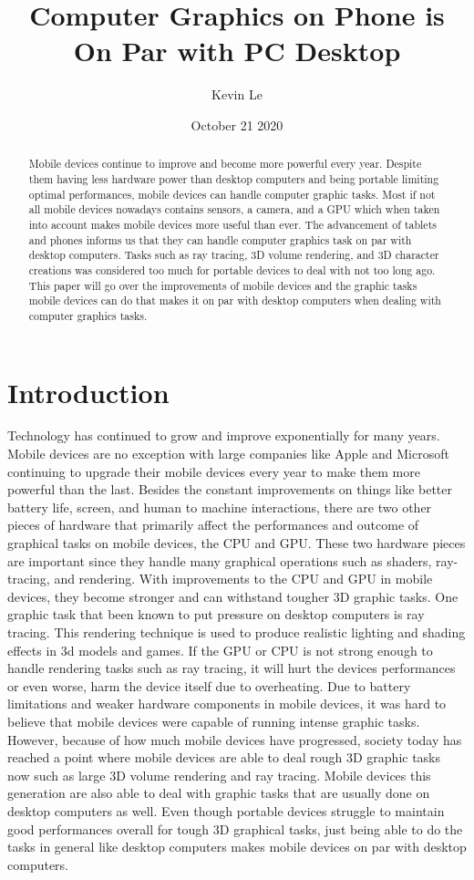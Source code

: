 \documentclass{article}
\title{Computer Graphics on Phone is On Par with PC Desktop}
\author{Kevin Le}
\date{October 21 2020}
\begin{document}
\maketitle

\begin{abstract}
   Mobile devices continue to improve and become more powerful every year. Despite them having less hardware power than desktop computers and being portable limiting optimal performances, mobile devices can handle computer graphic tasks. Most if not all mobile devices nowadays contains sensors, a camera, and a GPU which when taken into account makes mobile devices more useful than ever. The advancement of tablets and phones informs us that they can handle computer graphics task on par with desktop computers. Tasks such as ray tracing, 3D volume rendering, and 3D character creations was considered too much for portable devices to deal with not too long ago. This paper will go over the improvements of mobile devices and the graphic tasks mobile devices can do that makes it on par with desktop computers when dealing with computer graphics tasks. 
\end{abstract}

\section{Introduction}
   Technology has continued to grow and improve exponentially for many years. Mobile devices are no exception with large companies like Apple and Microsoft continuing to upgrade their mobile devices every year to make them more powerful than the last. Besides the constant improvements on things like better battery life, screen, and human to machine interactions, there are two other pieces of hardware that primarily affect the performances and outcome of graphical tasks on mobile devices, the CPU and GPU. These two hardware pieces are important since they handle many graphical operations such as shaders, ray-tracing, and rendering. With improvements to the CPU and GPU in mobile devices, they become stronger and can withstand tougher 3D graphic tasks. One graphic task that been known to put pressure on desktop computers is ray tracing. This rendering technique is used to produce realistic lighting and shading effects in 3d models and games. If the GPU or CPU is not strong enough to handle rendering tasks such as ray tracing, it will hurt the devices performances or even worse, harm the device itself due to overheating. Due to battery limitations and weaker hardware components in mobile devices, it was hard to believe that mobile devices were capable of running intense graphic tasks. However, because of how much mobile devices have progressed, society today has reached a point where mobile devices are able to deal rough 3D graphic tasks now such as large 3D volume rendering and ray tracing. Mobile devices this generation are also able to deal with graphic tasks that are usually done on desktop computers as well. Even though portable devices struggle to maintain good performances overall for tough 3D graphical tasks, just being able to do the tasks in general like desktop computers makes mobile devices on par with desktop computers.
\end{document}
